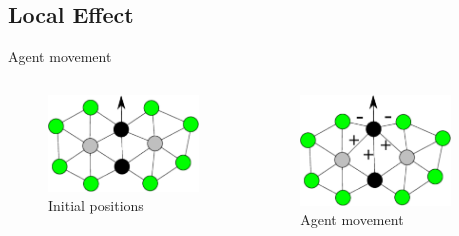 \documentclass{beamer}
\begin{document}
\subsection{Local Effect}
\begin{frame}{Agent movement}
  \begin{columns}
      \begin{figure}
        \begin{center}
          \includegraphics[width=4cm]{InterAgentEffect1.pdf}
        \end{center}
        \caption{Initial positions}
      \end{figure}
        \begin{figure}
          \begin{center}
            \includegraphics[width=4cm]{InterAgentEffect2.pdf}
          \end{center}
          \caption{Agent movement}
        \end{figure}
    \end{columns}
\end{frame}
\end{document}
